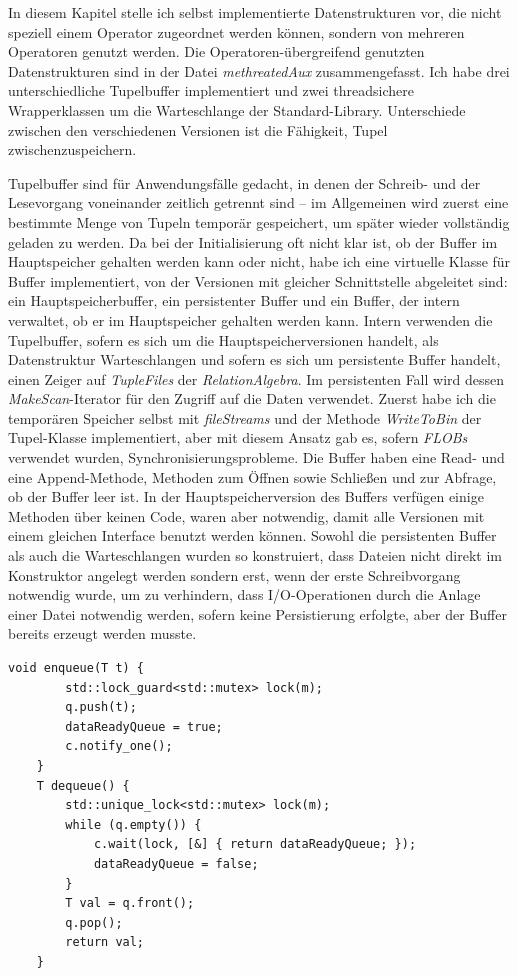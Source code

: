 \documentclass[a4paper,12pt,twoside]{article}
\newcommand{\Fb}[1]{\textit{#1}} %
\begin{document}
In diesem Kapitel stelle ich selbst implementierte Datenstrukturen vor, die nicht speziell einem Operator zugeordnet werden können, sondern von mehreren Operatoren genutzt werden. Die Operatoren-übergreifend genutzten Datenstrukturen sind in der Datei \Fb{methreatedAux} zusammengefasst. Ich habe drei unterschiedliche Tupelbuffer implementiert und zwei threadsichere Wrapperklassen um die Warteschlange der Standard-Library. Unterschiede zwischen den verschiedenen Versionen ist die Fähigkeit, Tupel zwischenzuspeichern.

Tupelbuffer sind für Anwendungsfälle gedacht, in denen der Schreib- und der Lesevorgang voneinander zeitlich getrennt sind -- im Allgemeinen wird zuerst eine bestimmte Menge von Tupeln temporär gespeichert, um später wieder vollständig geladen zu werden. Da bei der Initialisierung oft nicht klar ist, ob der Buffer im Hauptspeicher gehalten werden kann oder nicht, habe ich eine virtuelle Klasse für Buffer implementiert, von der Versionen mit gleicher Schnittstelle abgeleitet sind: ein Hauptspeicherbuffer, ein persistenter Buffer und ein Buffer, der intern verwaltet, ob er im Hauptspeicher gehalten werden kann. Intern verwenden die Tupelbuffer, sofern es sich um die Hauptspeicherversionen handelt, als Datenstruktur Warteschlangen und sofern es sich um persistente Buffer handelt, einen Zeiger auf \Fb{TupleFiles} der \Fb{RelationAlgebra}. Im persistenten Fall wird dessen \Fb{MakeScan}-Iterator für den Zugriff auf die Daten verwendet. Zuerst habe ich die temporären Speicher selbst mit \Fb{fileStreams} und der Methode \Fb{WriteToBin} der Tupel-Klasse implementiert, aber mit diesem Ansatz gab es, sofern \Fb{FLOBs} verwendet wurden, Synchronisierungsprobleme. Die Buffer haben eine Read- und eine Append-Methode, Methoden zum Öffnen sowie Schließen und zur Abfrage, ob der Buffer leer ist. In der Hauptspeicherversion des Buffers verfügen einige Methoden über keinen Code, waren aber notwendig, damit alle Versionen mit einem gleichen Interface benutzt werden können. Sowohl die persistenten Buffer als auch die Warteschlangen wurden so konstruiert, dass Dateien nicht direkt im Konstruktor angelegt werden sondern erst, wenn der erste Schreibvorgang notwendig wurde, um zu verhindern, dass I/O-Operationen durch die Anlage einer Datei notwendig werden, sofern keine Persistierung erfolgte, aber der Buffer bereits erzeugt werden musste.

\begin{minipage}{0.95\textwidth}
	\begin{lstlisting}[caption={Enqueue und Dequeue-Methode der threadsichere Warteschlange.}, label=list:queue]
	void enqueue(T t) {
		std::lock_guard<std::mutex> lock(m);
		q.push(t);
		dataReadyQueue = true;
		c.notify_one();
	}
	T dequeue() {
		std::unique_lock<std::mutex> lock(m);
		while (q.empty()) {
			c.wait(lock, [&] { return dataReadyQueue; });
			dataReadyQueue = false;
		}
		T val = q.front();
		q.pop();
		return val;
	}
	\end{lstlisting}
\end{minipage}
\end{document}
